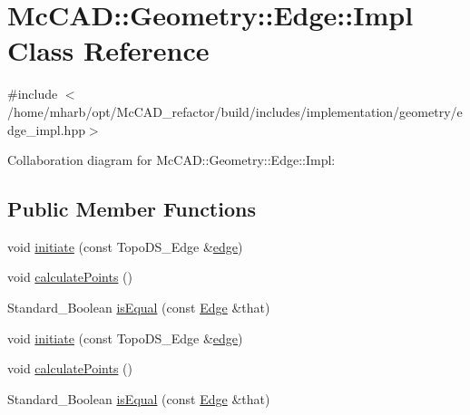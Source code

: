 \hypertarget{classMcCAD_1_1Geometry_1_1Edge_1_1Impl}{}\section{Mc\+C\+AD\+:\+:Geometry\+:\+:Edge\+:\+:Impl Class Reference}
\label{classMcCAD_1_1Geometry_1_1Edge_1_1Impl}


{\ttfamily \#include $<$/home/mharb/opt/\+Mc\+C\+A\+D\+\_\+refactor/build/includes/implementation/geometry/edge\+\_\+impl.\+hpp$>$}



Collaboration diagram for Mc\+C\+AD\+:\+:Geometry\+:\+:Edge\+:\+:Impl\+:
\subsection*{Public Member Functions}
\begin{DoxyCompactItemize}
\item 
void \hyperlink{classMcCAD_1_1Geometry_1_1Edge_1_1Impl_a73c526d6129fcf6a5644cc9e25e13809}{initiate} (const Topo\+D\+S\+\_\+\+Edge \&\hyperlink{classMcCAD_1_1Geometry_1_1Edge_1_1Impl_af6c62d8c4fb496f202ea8029a1304f5c}{edge})
\item 
void \hyperlink{classMcCAD_1_1Geometry_1_1Edge_1_1Impl_a6541fcc122721729d3f0f3001be3a8fa}{calculate\+Points} ()
\item 
Standard\+\_\+\+Boolean \hyperlink{classMcCAD_1_1Geometry_1_1Edge_1_1Impl_a318436db9969dfd122b8472c900b5b85}{is\+Equal} (const \hyperlink{classMcCAD_1_1Geometry_1_1Edge}{Edge} \&that)
\item 
void \hyperlink{classMcCAD_1_1Geometry_1_1Edge_1_1Impl_a73c526d6129fcf6a5644cc9e25e13809}{initiate} (const Topo\+D\+S\+\_\+\+Edge \&\hyperlink{classMcCAD_1_1Geometry_1_1Edge_1_1Impl_af6c62d8c4fb496f202ea8029a1304f5c}{edge})
\item 
void \hyperlink{classMcCAD_1_1Geometry_1_1Edge_1_1Impl_a6541fcc122721729d3f0f3001be3a8fa}{calculate\+Points} ()
\item 
Standard\+\_\+\+Boolean \hyperlink{classMcCAD_1_1Geometry_1_1Edge_1_1Impl_a318436db9969dfd122b8472c900b5b85}{is\+Equal} (const \hyperlink{classMcCAD_1_1Geometry_1_1Edge}{Edge} \&that)
\end{DoxyCompactItemize}
